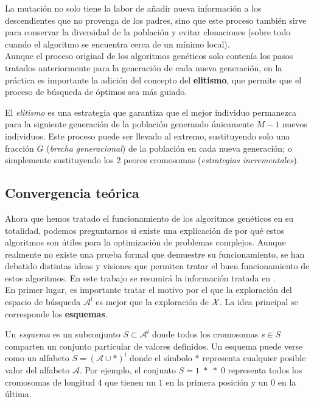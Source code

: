 La mutación no solo tiene la labor de añadir nueva información a los descendientes que no provenga de los padres, sino que este proceso también sirve para conservar la diversidad de la población y evitar clonaciones (sobre todo cuando el algoritmo se encuentra cerca de un mínimo local).\\

Aunque el proceso original de los algoritmos genéticos solo contenía los pasos tratados anteriormente para la generación de cada nueva generación, en la práctica es importante la adición del concepto del \textbf{elitismo}, que permite que el proceso de búsqueda de óptimos sea más guiado.

\begin{definition}
    El \textit{elitismo} es una estrategia que garantiza que el mejor individuo permanezca para la siguiente generación de la población generando únicamente $M-1$ nuevos individuos. Este proceso puede ser llevado al extremo, sustituyendo solo una fracción $G$ (\textit{brecha generacional}) de la población en cada nueva generación; o simplemente sustituyendo los 2 peores cromosomas (\textit{estrategias incrementales}).
\end{definition}
\subsection{Convergencia teórica}\label{geneticos-conv}
Ahora que hemos tratado el funcionamiento de los algoritmos genéticos en su totalidad, podemos preguntarnos si existe una explicación de por qué estos algoritmos son útiles para la optimización de problemas complejos. Aunque realmente no existe una prueba formal que demuestre su funcionamiento, se han debatido distintas ideas y visiones que permiten tratar el buen funcionamiento de estos algoritmos. En este trabajo se resumirá la información tratada en \cite{reeves-2002}.\\

En primer lugar, es importante tratar el motivo por el que la exploración del espacio de búsqueda $\mathscr{A}^l$ es mejor que la exploración de $\mathcal{X}$. La idea principal se corresponde los \textbf{esquemas}.

\begin{definition}
    Un \textit{esquema} es un subconjunto $S\subset \mathscr{A}^l$ donde todos los cromosomas $s\in S$ comparten un conjunto particular de valores definidos. Un esquema puede verse como un alfabeto $S=(\mathscr{A}\cup *)^l$ donde el símbolo $*$ representa cualquier posible valor del alfabeto $\mathscr{A}$. Por ejemplo, el conjunto $S=1\;*\;*\;0$ representa todos los cromosomas de longitud 4 que tienen un $1$ en la primera posición y un $0$ en la última.
\end{definition}

